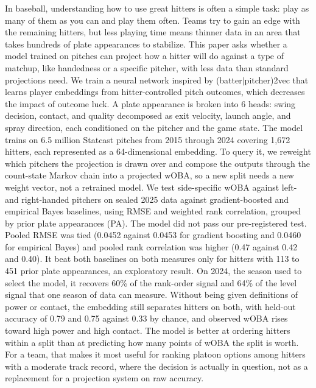 \documentclass[11pt,letterpaper]{article}
\begin{document}
In baseball, understanding how to use great hitters is often a simple task: play as many of them as you can and play them often. Teams try to gain an edge with the remaining hitters, but less playing time means thinner data in an area that takes hundreds of plate appearances to stabilize. This paper asks whether a model trained on pitches can project how a hitter will do against a type of matchup, like handedness or a specific pitcher, with less data than standard projections need. We train a neural network inspired by (batter$|$pitcher)2vec that learns player embeddings from hitter-controlled pitch outcomes, which decreases the impact of outcome luck. A plate appearance is broken into 6 heads: swing decision, contact, and quality decomposed as exit velocity, launch angle, and spray direction, each conditioned on the pitcher and the game state. The model trains on 6.5 million Statcast pitches from 2015 through 2024 covering 1,672 hitters, each represented as a 64-dimensional embedding. To query it, we reweight which pitchers the projection is drawn over and compose the outputs through the count-state Markov chain into a projected wOBA, so a new split needs a new weight vector, not a retrained model. We test side-specific wOBA against left- and right-handed pitchers on sealed 2025 data against gradient-boosted and empirical Bayes baselines, using RMSE and weighted rank correlation, grouped by prior plate appearances (PA). The model did not pass our pre-registered test. Pooled RMSE was tied (0.0452 against 0.0453 for gradient boosting and 0.0460 for empirical Bayes) and pooled rank correlation was higher (0.47 against 0.42 and 0.40). It beat both baselines on both measures only for hitters with 113 to 451 prior plate appearances, an exploratory result. On 2024, the season used to select the model, it recovers 60\% of the rank-order signal and 64\% of the level signal that one season of data can measure. Without being given definitions of power or contact, the embedding still separates hitters on both, with held-out accuracy of 0.79 and 0.75 against 0.33 by chance, and observed wOBA rises toward high power and high contact. The model is better at ordering hitters within a split than at predicting how many points of wOBA the split is worth. For a team, that makes it most useful for ranking platoon options among hitters with a moderate track record, where the decision is actually in question, not as a replacement for a projection system on raw accuracy.


\end{document}

